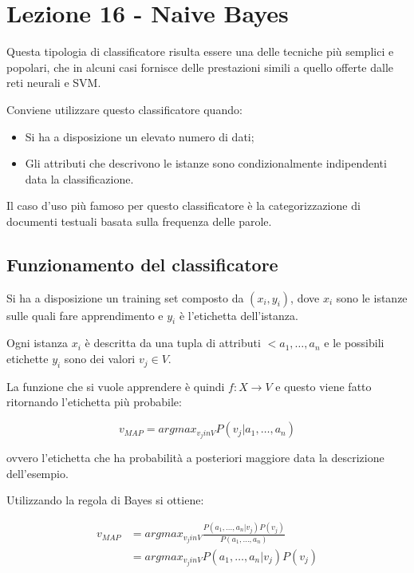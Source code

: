 
\section{Lezione 16 - Naive Bayes}

Questa tipologia di classificatore risulta essere una delle tecniche più semplici e popolari, che in alcuni casi fornisce delle prestazioni simili a quello offerte dalle reti neurali e SVM.

Conviene utilizzare questo classificatore quando:

\begin{itemize}
	\item Si ha a disposizione un elevato numero di dati;
	\item Gli attributi che descrivono le istanze sono condizionalmente indipendenti data la classificazione.
\end{itemize}

Il caso d'uso più famoso per questo classificatore è la categorizzazione di documenti testuali basata sulla frequenza delle parole.

\subsection{Funzionamento del classificatore}

Si ha a disposizione un training set composto da $(x_i, y_i)$, dove $x_i$ sono le istanze sulle quali fare apprendimento e $y_i$ è l'etichetta dell'istanza.

Ogni istanza $x_i$ è descritta da una tupla di attributi $<a_1, \ldots, a_n$ e le possibili etichette $y_i$ sono dei valori $v_j \in V$.

La funzione che si vuole apprendere è quindi $f :  X \rightarrow V $ e questo viene fatto ritornando l'etichetta più probabile:

$$
v_{MAP} = argmax_{v_j in V} P(v_j | a_1 , \ldots, a_n)
$$ 

ovvero l'etichetta che ha probabilità a posteriori maggiore data la descrizione dell'esempio.

Utilizzando la regola di Bayes si ottiene:

\begin{align*}
v_{MAP}  &= argmax_{v_j in V}\frac{ P( a_1 , \ldots, a_n | v_j)P(v_j)}{P( a_1 , \ldots, a_n)} \\
				&= argmax_{v_j in V} P( a_1 , \ldots, a_n | v_j)P(v_j)
\end{align*}

